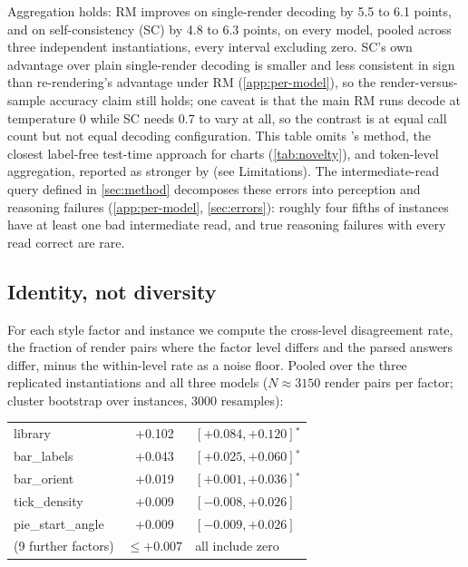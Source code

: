 \documentclass[11pt]{article}
\newcommand{\rmg}{\mathrm{RM}}
\begin{document}
Aggregation holds: $\rmg$ improves on single-render decoding by 5.5 to 6.1 points, and on self-consistency (SC) by 4.8 to 6.3 points, on every model, pooled across three independent instantiations, every interval excluding zero. SC's own advantage over plain single-render decoding is smaller and less consistent in sign than re-rendering's advantage under $\rmg$ (\cref{app:per-model}), so the render-versus-sample accuracy claim still holds; one caveat is that the main $\rmg$ runs decode at temperature 0 while SC needs 0.7 to vary at all, so the contrast is at equal call count but not equal decoding configuration. This table omits \citeauthor{jiang2025chartcoca}'s method, the closest label-free test-time approach for charts (\cref{tab:novelty}), and token-level aggregation, reported as stronger by \citet{kaya2026efficient} (see Limitations). The intermediate-read query defined in \cref{sec:method} decomposes these errors into perception and reasoning failures (\cref{app:per-model}, \cref{sec:errors}): roughly four fifths of instances have at least one bad intermediate read, and true reasoning failures with every read correct are rare.

\subsection{Identity, not diversity}
\label{sec:stylefactors}

For each style factor and instance we compute the cross-level disagreement rate, the fraction of render pairs where the factor level differs and the parsed answers differ, minus the within-level rate as a noise floor. Pooled over the three replicated instantiations and all three models ($N{\approx}3150$ render pairs per factor; cluster bootstrap over instances, 3000 resamples):

\begin{center}
\footnotesize
\setlength{\tabcolsep}{4pt}
\begin{tabular}{@{}l S[table-format=+1.3] l@{}}
\toprule
{} & {} &  \\
\midrule
library      & +0.102 & $[+0.084,+0.120]$$^\ast$ \\
bar\_labels  & +0.043 & $[+0.025,+0.060]$$^\ast$ \\
bar\_orient  & +0.019 & $[+0.001,+0.036]$$^\ast$ \\
tick\_density & +0.009 & $[-0.008,+0.026]$ \\
pie\_start\_angle & +0.009 & $[-0.009,+0.026]$ \\
(9 further factors) & {$\le+0.007$} & all include zero \\
\bottomrule
\end{tabular}
\end{center}
\end{document}
